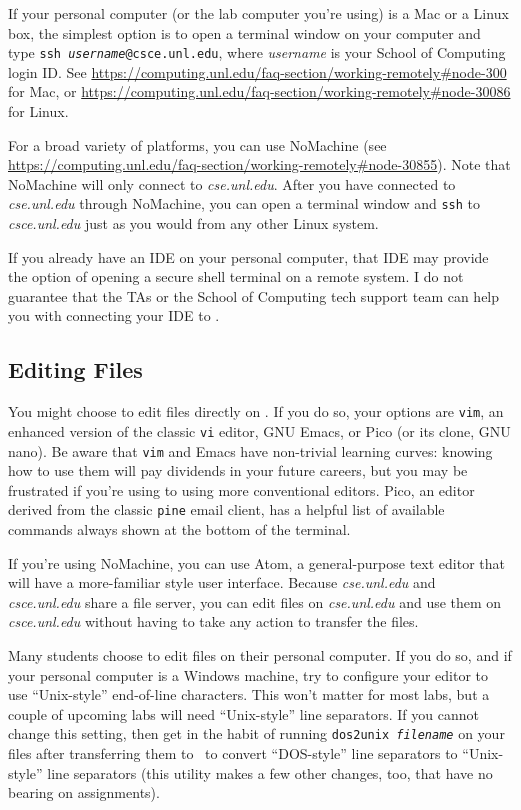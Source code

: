 If your personal computer (or the lab computer you're using) is a Mac or a
Linux box, the simplest option is to open a terminal window on your computer
and type \texttt{ssh \textit{username}@csce.unl.edu}, where \textit{username}
is your School of Computing login ID. See
\url{https://computing.unl.edu/faq-section/working-remotely#node-300} for Mac,
or \url{https://computing.unl.edu/faq-section/working-remotely#node-30086} for
Linux.

For a broad variety of platforms, you can use NoMachine (see
\url{https://computing.unl.edu/faq-section/working-remotely#node-30855}). Note
that NoMachine will only connect to \textit{cse.unl.edu}. After you have
connected to \textit{cse.unl.edu} through NoMachine, you can open a terminal
window and \texttt{ssh} to \textit{csce.unl.edu} just as you would from any
other Linux system.

If you already have an IDE on your personal computer, that IDE may provide the
option of opening a secure shell terminal on a remote system. I do not
guarantee that the TAs or the School of Computing tech support team can help
you with connecting your IDE to \runtimeenvironment.

\subsection{Editing Files}

You might choose to edit files directly on \runtimeenvironment. If you do so,
your options are \texttt{vim}, an enhanced version of the classic \texttt{vi}
editor, GNU Emacs, or Pico (or its clone, GNU nano). Be aware that \texttt{vim}
and Emacs have non-trivial learning curves: knowing how to use them will pay
dividends in your future careers, but you may be frustrated if you're using to
using more conventional editors. Pico, an editor derived from the classic
\texttt{pine} email client, has a helpful list of available commands always
shown at the bottom of the terminal.

If you're using NoMachine, you can use Atom, a general-purpose text editor that
will have a more-familiar style user interface. Because \textit{cse.unl.edu}
and \textit{csce.unl.edu} share a file server, you can edit files on
\textit{cse.unl.edu} and use them on \textit{csce.unl.edu} without having to
take any action to transfer the files.

Many students choose to edit files on their personal computer. If you do so,
and if your personal computer is a Windows machine, try to configure your
editor to use ``Unix-style'' end-of-line characters. This won't matter for most
labs, but a couple of upcoming labs will need ``Unix-style'' line separators.
If you cannot change this setting, then get in the habit of running
\texttt{dos2unix \textit{filename}} on your files after transferring them to
\runtimeenvironment\ to convert ``DOS-style'' line separators to ``Unix-style''
line separators (this utility makes a few other changes, too, that have no
bearing on \coursenumber assignments).

